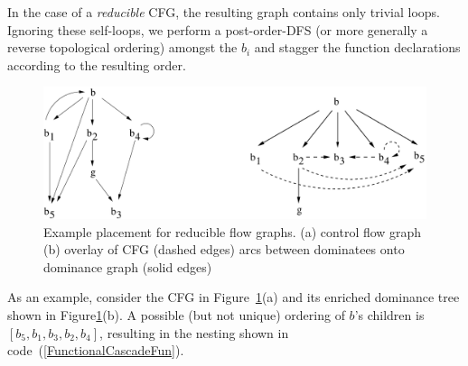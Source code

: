 In the case of a \emph{reducible} CFG, the resulting graph contains
only trivial loops. Ignoring these self-loops, we perform a
post-order-DFS (or more generally a reverse topological ordering)
amongst the $b_i$ and stagger the function declarations according to
the resulting order.
\begin{figure}
\begin{center}
\includegraphics[scale=0.5]{shortloopAnalysis1}
\end{center}
\caption{\label{FigShortLoopAnalysis1ReducibleGraph} Example placement
  for reducible flow graphs. (a) control flow graph (b) overlay of CFG
  (dashed edges) arcs between dominatees onto dominance graph (solid
  edges) }
\end{figure}
As an example, consider the CFG in
Figure~\ref{FigShortLoopAnalysis1ReducibleGraph}(a) and its enriched
dominance tree shown in
Figure\ref{FigShortLoopAnalysis1ReducibleGraph}(b). A possible (but
not unique) ordering of $b$'s children is $[b_5,b_1,b_3,b_2,b_4]$,
resulting in the nesting shown in code~(\ref{FunctionalCascadeFun}).
